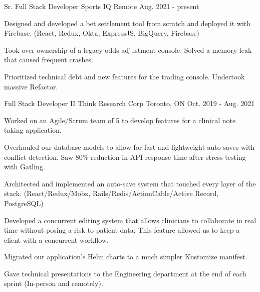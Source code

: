 

\begin{cventries}

  \cventry
    {Sr. Full Stack Developer} %
    {Sports IQ} %
    {Remote} %
    {Aug. 2021 - present} %
    {
      \begin{cvitems} %
        \item {Designed and developed a bet settlement tool from scratch and deployed it with Firebase. (React, Redux, Okta, ExpressJS, BigQuery, Firebase)}
        \item {Took over ownership of a legacy odds adjustment console. Solved a memory leak that caused frequent crashes.}
        \item {Prioritized technical debt and new features for the trading console. Undertook massive Refactor.}
      \end{cvitems}
    }

  \cventry
    {Full Stack Developer II} %
    {Think Research Corp} %
    {Toronto, ON} %
    {Oct. 2019 - Aug. 2021} %
    {
      \begin{cvitems} %
        \item {Worked on an Agile/Scrum team of 5 to develop features for a clinical note taking application.}
        \item {Overhauled our database models to allow for fast and lightweight auto-saves with conflict detection. Saw 80\% reduction in API response time after stress testing with Gatling.}
        \item {Architected and implemented an auto-save system that touched every layer of the stack. (React/Redux/Mobx, Rails/Redis/ActionCable/Active Record, PostgreSQL)}
        \item {Developed a concurrent editing system that allows clinicians to collaborate in real time without posing a risk to patient data. This feature allowed us to keep a client with a concurrent workflow.}
        \item {Migrated our application's Helm charts to a much simpler Kustomize manifest.}
        \item {Gave technical presentations to the Engineering department at the end of each sprint (In-person and remotely).}
      \end{cvitems}
    }


\end{cventries}
